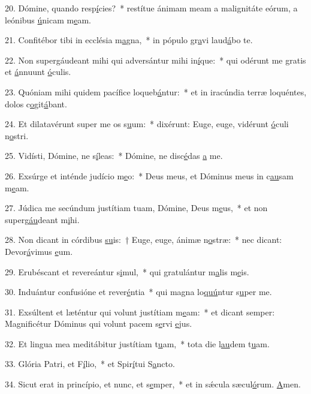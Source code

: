 20. Dómine, quando resp\uline{í}cies?~* restítue ánimam meam a malignitáte eórum, a leónibus \uline{ú}nicam m\uline{e}am.\par 
21. Confitébor tibi in ecclésia m\uline{a}gna,~* in pópulo gr\uline{a}vi laud\uline{á}bo te.\par 
22. Non supergáudeant mihi qui adversántur mihi in\uline{í}que:~* qui odérunt me gratis et \uline{á}nnuunt \uline{ó}culis.\par 
23. Quóniam mihi quidem pacífice loqueb\uline{á}ntur:~* et in iracúndia terræ loquéntes, dolos c\uline{o}git\uline{á}bant.\par 
24. Et dilatavérunt super me os s\uline{u}um:~* dixérunt: Euge, euge, vidérunt \uline{ó}culi n\uline{o}stri.\par 
25. Vidísti, Dómine, ne s\uline{í}leas:~* Dómine, ne disc\uline{é}das \uline{a} me.\par 
26. Exsúrge et inténde judício m\uline{e}o:~* Deus meus, et Dóminus meus in c\uline{au}sam m\uline{e}am.\par 
27. Júdica me secúndum justítiam tuam, Dómine, Deus m\uline{e}us,~* et non superg\uline{áu}deant m\uline{i}hi.\par 
28. Non dicant in córdibus \uline{su}is:~† Euge, euge, ánimæ n\uline{o}stræ:~* nec dicant: Devor\uline{á}vimus \uline{e}um.\par 
29. Erubéscant et revereántur s\uline{i}mul,~* qui gratulántur m\uline{a}lis m\uline{e}is.\par 
30. Induántur confusióne et rever\uline{é}ntia~* qui magna lo\uline{quú}ntur s\uline{u}per me.\par 
31. Exsúltent et læténtur qui volunt justítiam m\uline{e}am:~* et dicant semper: Magnificétur Dóminus qui volunt pacem s\uline{e}rvi \uline{e}jus.\par 
32. Et lingua mea meditábitur justítiam t\uline{u}am,~* tota die l\uline{au}dem t\uline{u}am.\par 
33. Glória Patri, et F\uline{í}lio,~* et Spir\uline{í}tui S\uline{a}ncto.\par 
34. Sicut erat in princípio, et nunc, et s\uline{e}mper,~* et in sǽcula sæcul\uline{ó}rum. \uline{A}men.\par 
